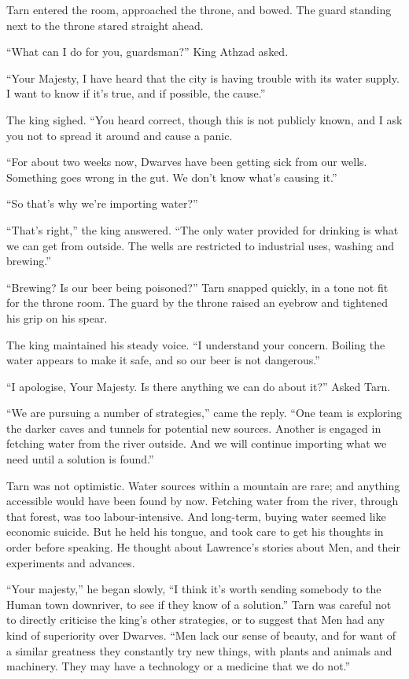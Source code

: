 Tarn entered the room, approached the throne, and bowed.  The guard standing next to the throne stared straight ahead.

``What can I do for you, guardsman?'' King Athzad asked.

``Your Majesty, I have heard that the city is having trouble with its water supply.  I want to know if it's true, and if possible, the cause.''

The king sighed.  ``You heard correct, though this is not publicly known, and I ask you not to spread it around and cause a panic.

``For about two weeks now, Dwarves have been getting sick from our wells.  Something goes wrong in the gut.  We don't know what's causing it.''

``So that's why we're importing water?''

``That's right,'' the king answered.  ``The only water provided for drinking is what we can get from outside.  The wells are restricted to industrial uses, washing and brewing.''

``Brewing?  Is our beer being poisoned?'' Tarn snapped quickly, in a tone not fit for the throne room.  The guard by the throne raised an eyebrow and tightened his grip on his spear.

The king maintained his steady voice.  ``I understand your concern.  Boiling the water appears to make it safe, and so our beer is not dangerous.''

``I apologise, Your Majesty.  Is there anything we can do about it?''  Asked Tarn.

``We are pursuing a number of strategies,'' came the reply.  ``One team is exploring the darker caves and tunnels for potential new sources.  Another is engaged in fetching water from the river outside.  And we will continue importing what we need until a solution is found.''

Tarn was not optimistic.  Water sources within a mountain are rare; and anything accessible would have been found by now.  Fetching water from the river, through that forest, was too labour-intensive.  And long-term, buying water seemed like economic suicide.  But he held his tongue, and took care to get his thoughts in order before speaking.  He thought about Lawrence's stories about Men, and their experiments and advances.

``Your majesty,'' he began slowly, ``I think it's worth sending somebody to the Human town downriver, to see if they know of a solution.''  Tarn was careful not to directly criticise the king's other strategies, or to suggest that Men had any kind of superiority over Dwarves.
``Men lack our sense of beauty, and for want of a similar greatness they constantly try new things, with plants and animals and machinery.  They may have a technology or a medicine that we do not.''

